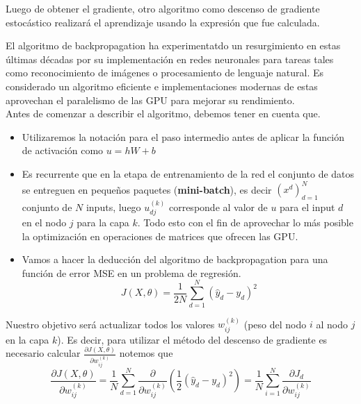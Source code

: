 Luego de obtener el gradiente, otro algoritmo como descenso de gradiente estocástico realizará el aprendizaje usando la expresión que fue calculada. 

El algoritmo de backpropagation ha experimentatdo un resurgimiento en estas últimas décadas por su implementación en redes neuronales para tareas tales como reconocimiento de imágenes o procesamiento de lenguaje natural. 
Es considerado un algoritmo eficiente e implementaciones modernas de estas aprovechan el paralelismo de las GPU para mejorar su rendimiento. \\

Antes de comenzar a describir el algoritmo, debemos tener en cuenta que.   
\begin{itemize}

	\item Utilizaremos la notación para el paso intermedio antes de aplicar la función de activación como $u = hW + b$
  
	\item Es recurrente que en la etapa de entrenamiento de la red el conjunto de datos se entreguen en pequeños paquetes (\textbf{mini-batch}), es decir $(x^d)_{d=1}^N$  conjunto de $N$ inputs, luego $u_{dj}^{(k)}$ corresponde al valor de $u$ para el input $d$ en el nodo $j$ para la capa $k$. Todo esto con el fin de aprovechar lo más posible la optimización en operaciones de matrices que ofrecen las GPU.

   
   \item Vamos a hacer la deducción del algoritmo de backpropagation para una función de error MSE en un problema de regresión.
   \[
	J(X ,\theta) = \frac{1}{2N}\sum_{d=1}^N(\hat{y}_d-y_d)^2
	\]	
  
\end{itemize} 

Nuestro objetivo será actualizar todos los valores $w_{ij}^{(k)}$ (peso del nodo $i$ al nodo $j$ en la capa $k$). Es decir, para utilizar el método del descenso de gradiente es necesario calcular $\frac{\partial J(X , \theta) }{\partial w_{ij}^{(k)}}$ notemos que 
\[
\frac{\partial J(X , \theta) }{\partial w_{ij}^{(k)}} = \frac{1}{N}\sum_{d=1}^N \frac{\partial}{\partial w_{ij}^{(k)}} \left ( \frac{1}{2}(\hat{y}_d-y_d)^2 \right) = \frac{1}{N}\sum_{i=1}^N \frac{\partial J_d}{\partial w_{ij}^{(k)}}
\]

